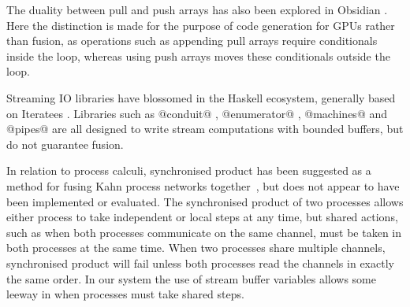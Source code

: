 
The duality between pull and push arrays has also been explored in Obsidian \cite{claessen2012expressive, svensson2014defunctionalizing}. Here the distinction is made for the purpose of code generation for GPUs rather than fusion, as operations such as appending pull arrays require conditionals inside the loop, whereas using push arrays moves these conditionals outside the loop.

Streaming IO libraries have blossomed in the Haskell ecosystem, generally based on Iteratees \cite{kiselyov2012iteratees}. Libraries such as @conduit@ \cite{hackage:conduit}, @enumerator@ \cite{hackage:enumerator}, @machines@ \cite{hackage:machines} and @pipes@ \cite{hackage:pipes} are all designed to write stream computations with bounded buffers, but do not guarantee fusion.



In relation to process calculi, synchronised product has been suggested as a method for fusing Kahn process networks together~\cite{fradet2004network}, but does not appear to have been implemented or evaluated. The synchronised product of two processes allows either process to take independent or local steps at any time, but shared actions, such as when both processes communicate on the same channel, must be taken in both processes at the same time. When two processes share multiple channels, synchronised product will fail unless both processes read the channels in exactly the same order. In our system the use of stream buffer variables allows some leeway in when processes must take shared steps.

